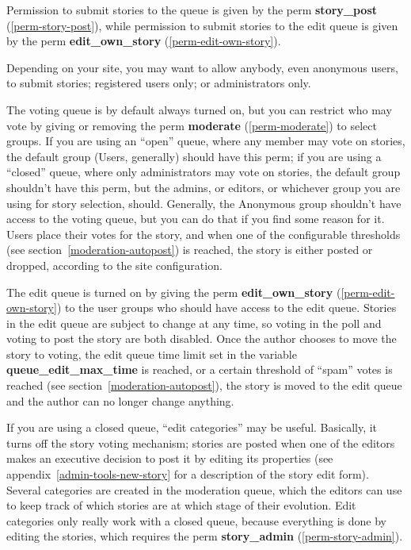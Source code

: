 Permission to submit stories to the queue is given by the perm {\bf story\_post} (\ref{perm-story-post}), while permission to submit stories to the edit queue is given by the perm {\bf edit\_own\_story} (\ref{perm-edit-own-story}).  

Depending on your site, you may want to allow anybody, even anonymous users, to submit stories; registered users only; or administrators only.

The voting queue is by default always turned on, but you can restrict who may vote by giving or removing the perm {\bf moderate} (\ref{perm-moderate}) to select groups.  If you are using an ``open'' queue, where any member may vote on stories, the default group (Users, generally) should have this perm; if you are using a ``closed'' queue, where only administrators may vote on stories, the default group shouldn't have this perm, but the admins, or editors, or whichever group you are using for story selection, should.  Generally, the Anonymous group shouldn't have access to the voting queue, but you can do that if you find some reason for it.  Users place their votes for the story, and when one of the configurable thresholds (see section~\ref{moderation-autopost}) is reached, the story is either posted or dropped, according to the site configuration.

The edit queue is turned on by giving the perm {\bf edit\_own\_story} (\ref{perm-edit-own-story}) to the user groups who should have access to the edit queue.  Stories in the edit queue are subject to change at any time, so voting in the poll and voting to post the story are both disabled.  Once the author chooses to move the story to voting, the edit queue time limit set in the variable {\bf queue\_edit\_max\_time} is reached, or a certain threshold of ``spam'' votes is reached (see section~\ref{moderation-autopost}), the story is moved to the edit queue and the author can no longer change anything.

If you are using a closed queue, ``edit categories'' may be useful.  Basically, it turns off the story voting mechanism; stories are posted when one of the editors makes an executive decision to post it by editing its properties (see appendix~\ref{admin-tools-new-story} for a description of the story edit form).  Several categories are created in the moderation queue, which the editors can use to keep track of which stories are at which stage of their evolution.  Edit categories only really work with a closed queue, because everything is done by editing the stories, which requires the perm {\bf story\_admin} (\ref{perm-story-admin}).

